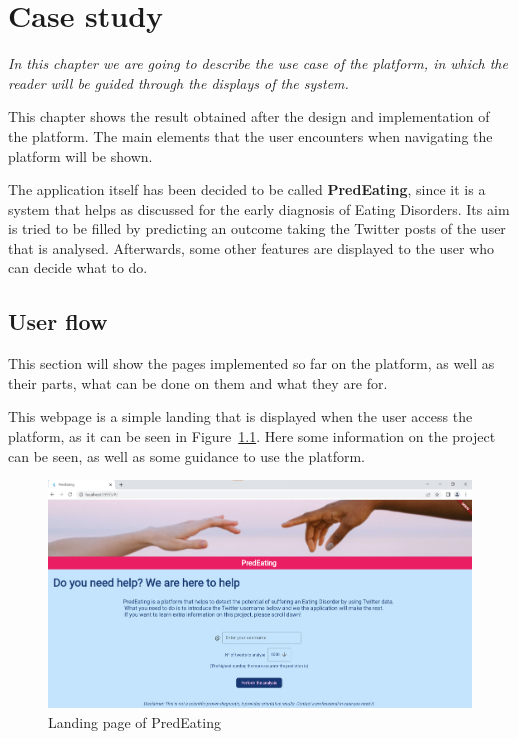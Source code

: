 \chapter{Case study}

\label{chap:case-study}

\textit{In this chapter we are going to describe the use case of the platform, in which the reader will be guided through the displays of the system.}

\clearpage

This chapter shows the result obtained after the design and implementation of the platform. The main elements that the user encounters when navigating the platform will be shown. 

The application itself has been decided to be called \textbf{PredEating}, since it is a system that helps as discussed for the early diagnosis of Eating Disorders. Its aim is tried to be filled by predicting an outcome taking the Twitter posts of the user that is analysed. Afterwards, some other features are displayed to the user who can decide what to do.

\section{User flow}

This section will show the pages implemented so far on the platform, as well as their parts, what can be done on them and what they are for.

This webpage is a simple landing that is displayed when the user access the platform, as it can be seen in Figure~\ref{fig:landing}. Here some information on the project can be seen, as well as some guidance to use the platform.


\begin{figure}[!htp]
    \centering
    \includegraphics[scale=0.5]{img/case/landing.png}
    \caption{Landing page of PredEating}
    \label{fig:landing}
\end{figure}

